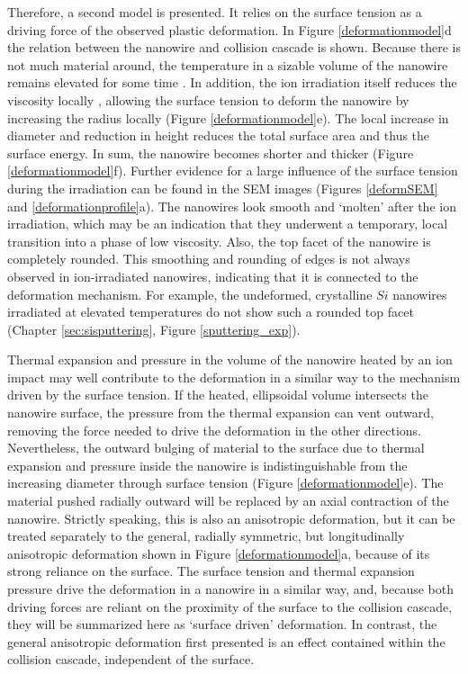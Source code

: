 Therefore, a second model is presented. It relies on the surface tension as a driving force of the observed plastic deformation. In Figure \ref{deformationmodel}d the relation between the nanowire and collision cascade is shown. Because there is not much material around, the temperature in a sizable volume of the nanowire remains elevated for some time \cite{borschel_ion-solid_2012,greaves_enhanced_2013,anders_sputtering_2015,johannes_ion_2015}. In addition, the ion irradiation itself reduces the viscosity locally \cite{snoeks_stress_1997,hu_burrowing_2002,mayr_mechanisms_2003}, allowing the surface tension to deform the nanowire by increasing the radius locally (Figure \ref{deformationmodel}e). The local increase in diameter and reduction in height reduces the total surface area and thus the surface energy. In sum, the nanowire becomes shorter and thicker (Figure \ref{deformationmodel}f). Further evidence for a large influence of the surface tension during the irradiation can be found in the SEM images (Figures \ref{deformSEM} and \ref{deformationprofile}a). The nanowires look smooth and `molten' after the ion irradiation, which may be an indication that they underwent a temporary, local transition into a phase of low viscosity. Also, the top facet of the nanowire is completely rounded. This smoothing and rounding of edges is not always observed in ion-irradiated nanowires, indicating that it is connected to the deformation mechanism. For example, the undeformed, crystalline $Si$ nanowires irradiated at elevated temperatures do not show such a rounded top facet (Chapter \ref{sec:sisputtering}, Figure \ref{sputtering_exp}).

Thermal expansion and pressure in the volume of the nanowire heated by an ion impact may well contribute to the deformation in a similar way to the mechanism driven by the surface tension. If the heated, ellipsoidal volume intersects the nanowire surface, the pressure from the thermal expansion can vent outward, removing the force needed to drive the deformation in the other directions. Nevertheless, the outward bulging of material to the surface due to thermal expansion and pressure inside the nanowire is indistinguishable from the increasing diameter through surface tension (Figure \ref{deformationmodel}e). The material pushed radially outward will be replaced by an axial contraction of the nanowire. Strictly speaking, this is also an anisotropic deformation, but it can be treated separately to the general, radially symmetric, but longitudinally anisotropic deformation shown in Figure \ref{deformationmodel}a, because of its strong reliance on the surface. The surface tension and thermal expansion pressure drive the deformation in a nanowire in a similar way, and, because both driving forces are reliant on the proximity of the surface to the collision cascade, they will be summarized here as `surface driven' deformation. In contrast, the general anisotropic deformation first presented is an effect contained within the collision cascade, independent of the surface. 

